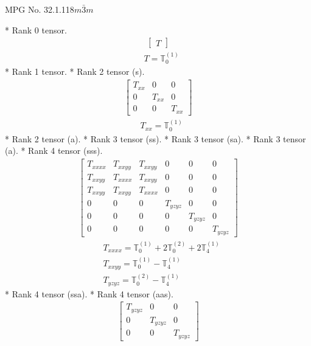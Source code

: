 \documentclass[fleqn,8pt,landscape]{jsarticle}
\begin{document}
\setcounter{MaxMatrixCols}{32}

\renewcommand{\tablename}{Table~}
\renewcommand{\figurename}{Figure~}
\begin{center}
\LARGE
MPG No. 32.1.118\quad$m\bar{3}m$
\end{center}
* Rank 0 tensor.
\begin{align*}
\begin{bmatrix} T \end{bmatrix}
\end{align*}
\begin{align*}
& T = \mathbb{T}_{0}^{(1)}
\end{align*}
* Rank 1 tensor.
* Rank 2 tensor (s).
\begin{align*}
\begin{bmatrix} T_{xx} & 0 & 0 \\ 0 & T_{xx} & 0 \\ 0 & 0 & T_{xx} \end{bmatrix}
\end{align*}
\begin{align*}
& T_{xx} = \mathbb{T}_{0}^{(1)}
\end{align*}
* Rank 2 tensor (a).
* Rank 3 tensor (ss).
* Rank 3 tensor (sa).
* Rank 3 tensor (a).
* Rank 4 tensor (sss).
\begin{align*}
\begin{bmatrix} T_{xxxx} & T_{xxyy} & T_{xxyy} & 0 & 0 & 0 \\ T_{xxyy} & T_{xxxx} & T_{xxyy} & 0 & 0 & 0 \\ T_{xxyy} & T_{xxyy} & T_{xxxx} & 0 & 0 & 0 \\ 0 & 0 & 0 & T_{yzyz} & 0 & 0 \\ 0 & 0 & 0 & 0 & T_{yzyz} & 0 \\ 0 & 0 & 0 & 0 & 0 & T_{yzyz} \end{bmatrix}
\end{align*}
\begin{align*}
& T_{xxxx} = \mathbb{T}_{0}^{(1)} + 2 \mathbb{T}_{0}^{(2)} + 2 \mathbb{T}_{4}^{(1)} \\
& T_{xxyy} = \mathbb{T}_{0}^{(1)} - \mathbb{T}_{4}^{(1)} \\
& T_{yzyz} = \mathbb{T}_{0}^{(2)} - \mathbb{T}_{4}^{(1)}
\end{align*}
* Rank 4 tensor (ssa).
* Rank 4 tensor (aas).
\begin{align*}
\begin{bmatrix} T_{yzyz} & 0 & 0 \\ 0 & T_{yzyz} & 0 \\ 0 & 0 & T_{yzyz} \end{bmatrix}
\end{align*}
\end{document}
